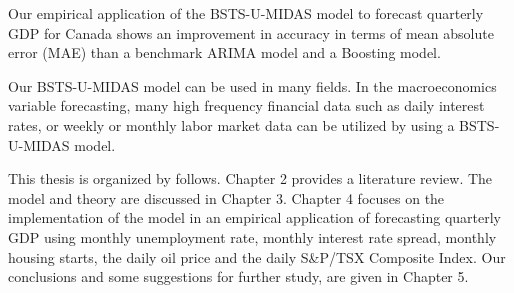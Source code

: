 Our empirical application of the BSTS-U-MIDAS model to forecast quarterly GDP for Canada shows an improvement in accuracy in terms of mean absolute error (MAE) than a benchmark ARIMA model and a Boosting model. 

Our BSTS-U-MIDAS model can be used in many fields. In the macroeconomics variable forecasting, many high frequency financial data such as daily interest rates, or weekly or monthly labor market data can be utilized by using a BSTS-U-MIDAS model.


This thesis is organized by follows. Chapter 2 provides a literature review. The model and theory are discussed in Chapter 3. Chapter 4 focuses on the implementation of the model in an empirical application of forecasting quarterly GDP using monthly unemployment rate,  monthly interest rate spread, monthly housing starts, the daily oil price and the daily  S\&P/TSX Composite Index. Our conclusions and some suggestions for further study, are given in Chapter 5.


%
%

